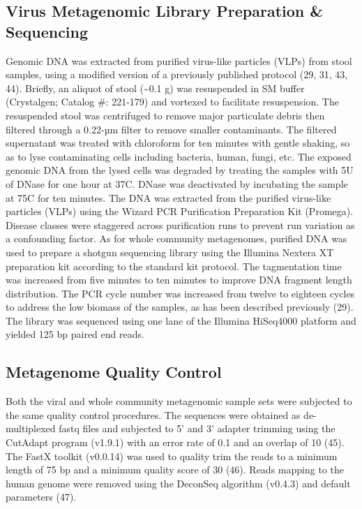 \documentclass[12pt,]{article}
\begin{document}
\subsection{Virus Metagenomic Library Preparation \&
Sequencing}\label{virus-metagenomic-library-preparation-sequencing}

Genomic DNA was extracted from purified virus-like particles (VLPs) from
stool samples, using a modified version of a previously published
protocol (29, 31, 43, 44). Briefly, an aliquot of stool
(\textasciitilde{}0.1 g) was resuspended in SM buffer (Crystalgen;
Catalog \#: 221-179) and vortexed to facilitate resuspension. The
resuspended stool was centrifuged to remove major particulate debris
then filtered through a 0.22-µm filter to remove smaller contaminants.
The filtered supernatant was treated with chloroform for ten minutes
with gentle shaking, so as to lyse contaminating cells including
bacteria, human, fungi, etc. The exposed genomic DNA from the lysed
cells was degraded by treating the samples with 5U of DNase for one hour
at 37C. DNase was deactivated by incubating the sample at 75C for ten
minutes. The DNA was extracted from the purified virus-like particles
(VLPs) using the Wizard PCR Purification Preparation Kit (Promega).
Disease classes were staggered across purification runs to prevent run
variation as a confounding factor. As for whole community metagenomes,
purified DNA was used to prepare a shotgun sequencing library using the
Illumina Nextera XT preparation kit according to the standard kit
protocol. The tagmentation time was increased from five minutes to ten
minutes to improve DNA fragment length distribution. The PCR cycle
number was increased from twelve to eighteen cycles to address the low
biomass of the samples, as has been described previously (29). The
library was sequenced using one lane of the Illumina HiSeq4000 platform
and yielded 125 bp paired end reads.

\subsection{Metagenome Quality
Control}\label{metagenome-quality-control}

Both the viral and whole community metagenomic sample sets were
subjected to the same quality control procedures. The sequences were
obtained as de-multiplexed fastq files and subjected to 5' and 3'
adapter trimming using the CutAdapt program (v1.9.1) with an error rate
of 0.1 and an overlap of 10 (45). The FastX toolkit (v0.0.14) was used
to quality trim the reads to a minimum length of 75 bp and a minimum
quality score of 30 (46). Reads mapping to the human genome were removed
using the DeconSeq algorithm (v0.4.3) and default parameters (47).
\end{document}
